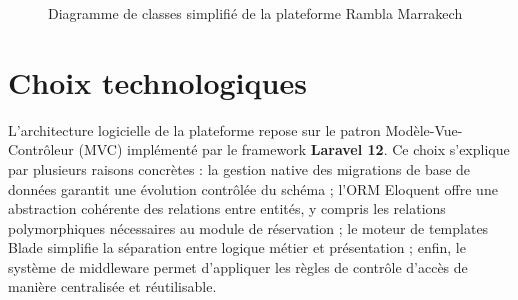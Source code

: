 \documentclass[12pt,a4paper]{report}
\begin{document}
\begin{figure}[h]
    \caption{Diagramme de classes simplifié de la plateforme Rambla Marrakech}
    \label{fig:classes}
\end{figure}

\section{Choix technologiques}

L'architecture logicielle de la plateforme repose sur le patron
Modèle-Vue-Contrôleur (MVC) implémenté par le framework \textbf{Laravel 12}.
Ce choix s'explique par plusieurs raisons concrètes : la gestion native des
migrations de base de données garantit une évolution contrôlée du schéma ;
l'ORM Eloquent offre une abstraction cohérente des relations entre entités,
y compris les relations polymorphiques nécessaires au module de réservation ;
le moteur de templates Blade simplifie la séparation entre logique métier et
présentation ; enfin, le système de middleware permet d'appliquer les règles
de contrôle d'accès de manière centralisée et réutilisable.
\end{document}
